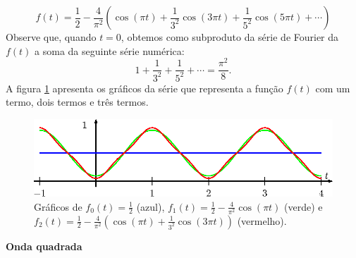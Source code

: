 \documentclass[a4paper,10pt]{book}
\begin{document}
 \begin{equation}
 f(t)=\frac{1}{2}-\frac{4}{\pi^2}\left(\cos(\pi t)+\frac{1}{3^2}\cos(3\pi t)+\frac{1}{5^2}\cos(5\pi t)+\cdots\right)
 \end{equation}
 Observe que, quando $t=0$, obtemos como subproduto da série de Fourier da $f(t)$ a soma da seguinte série numérica:
 \begin{equation}\label{serie_inv_impar}
 1+\frac{1}{3^2}+\frac{1}{5^2}+\cdots=\frac{\pi^2}{8}.
 \end{equation}
 A figura \ref{fig_conv_triangular} apresenta os gráficos da série que representa a função $f(t)$ com um termo, dois termos e três termos.
 \begin{figure}[!ht]
 \begin{center}
 \includegraphics{figs/cap_series_figura_2}\end{center}
 \caption{\label{fig_conv_triangular}Gráficos de $f_0(t)=\frac{1}{2}$ (azul), $f_1(t)=\frac{1}{2}-\frac{4}{\pi^2}\cos(\pi t)$ (verde) e $f_2(t)=\frac{1}{2}-\frac{4}{\pi^2}\left(\cos(\pi t)+\frac{1}{3^2}\cos(3\pi t)\right)$ (vermelho).}
 \end{figure}

 {\bf Onda quadrada}
\end{document}

